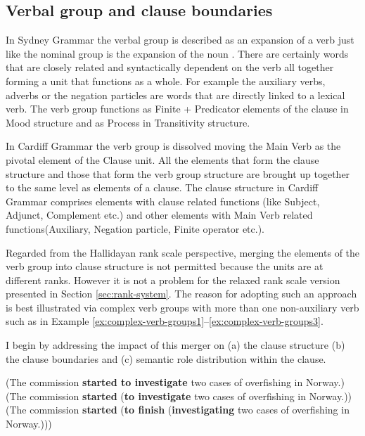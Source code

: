 \subsection{Verbal group and clause boundaries}
\label{sec:verbal-grpoup-and-clause-division}
In Sydney Grammar the verbal group is described as an expansion of a verb just like the nominal group is the expansion of the noun \citep[396]{Halliday2013}. There are certainly words that are closely related and syntactically dependent on the verb all together forming a unit that functions as a whole. For example the auxiliary verbs, adverbs or the negation particles are words that are directly linked to a lexical verb. The verb group functions as Finite + Predicator elements of the clause in Mood structure and as Process in Transitivity structure. 

In Cardiff Grammar the verb group is dissolved moving the Main Verb as the pivotal element of the Clause unit. All the elements that form the clause structure and those that form the verb group structure are brought up together to the same level as elements of a clause. The clause structure in Cardiff Grammar comprises elements with clause related functions (like Subject, Adjunct, Complement etc.) and other elements with Main Verb related functions(Auxiliary, Negation particle, Finite operator etc.).

Regarded from the Hallidayan rank scale perspective, merging the elements of the verb group into clause structure is not permitted because the units are at different ranks. However it is not a problem for the relaxed rank scale version presented in Section \ref{sec:rank-system}. The reason for adopting such an approach is best illustrated via complex verb groups with more than one non-auxiliary verb such as in Example \ref{ex:complex-verb-groups1}--\ref{ex:complex-verb-groups3}. 

I begin by addressing the impact of this merger on (a) the clause structure (b) the clause boundaries and (c) semantic role distribution within the clause.

\begin{exe}
	\ex\label{ex:complex-verb-groups1}
	(The commission \textbf{started to investigate} two cases of overfishing in Norway.)  
	\ex\label{ex:complex-verb-groups2}
	(The commission \textbf{started} (\textbf{to investigate} two cases of overfishing in Norway.))
	\ex\label{ex:complex-verb-groups3}
	(The commission \textbf{started} (\textbf{to finish} (\textbf{investigating} two cases of overfishing in Norway.)))
\end{exe}

